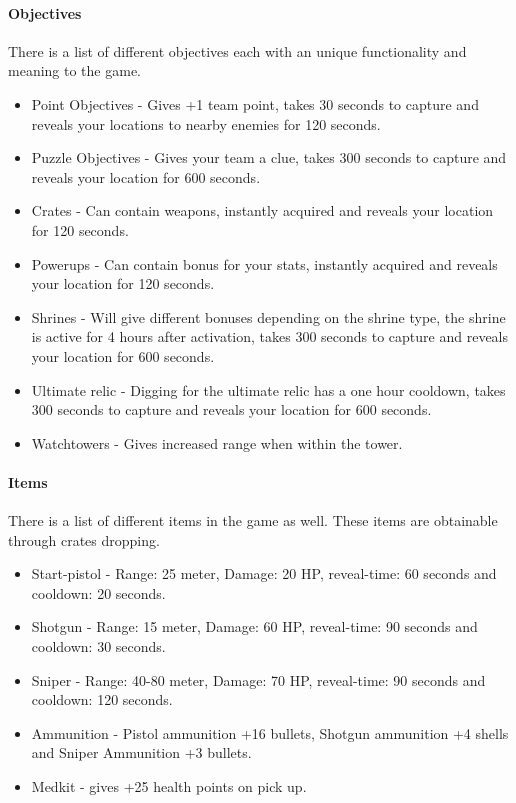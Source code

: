 \paragraph{Objectives}
There is a list of different objectives each with an unique functionality and meaning to the game.
\begin{itemize}
\item Point Objectives - Gives +1 team point, takes 30 seconds to capture and reveals your locations to nearby enemies for 120 seconds.
\item Puzzle Objectives - Gives your team a clue, takes 300 seconds to capture and reveals your location for 600 seconds.
\item Crates - Can contain weapons, instantly acquired and reveals your location for 120 seconds.
\item Powerups - Can contain bonus for your stats,  instantly acquired and reveals your location for 120 seconds.
\item Shrines - Will give different bonuses depending on the shrine type, the shrine is active for 4 hours after activation, takes 300 seconds to capture and reveals your location for 600 seconds.
\item Ultimate relic - Digging for the ultimate relic has a one hour cooldown, takes 300 seconds to capture and reveals your location for 600 seconds.
\item Watchtowers - Gives increased range when within the tower.
\end{itemize}

\paragraph{Items}
There is a list of different items in the game as well. These items are obtainable through crates dropping.
\begin{itemize}
\item Start-pistol - Range: 25 meter, Damage: 20 HP, reveal-time: 60 seconds and cooldown: 20 seconds.
\item Shotgun - Range: 15 meter, Damage: 60 HP, reveal-time: 90 seconds and cooldown: 30 seconds.
\item Sniper - Range: 40-80 meter, Damage: 70 HP, reveal-time: 90 seconds and cooldown: 120 seconds.
\item Ammunition - Pistol ammunition +16 bullets, Shotgun ammunition +4 shells and Sniper Ammunition +3 bullets.
\item Medkit - gives +25 health points on pick up.
\end{itemize}

